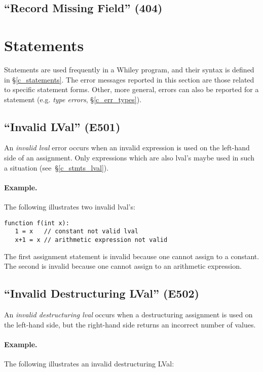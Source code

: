 \subsection{``Record Missing Field'' (404)}


\section{Statements}

Statements are used frequently in a Whiley program, and their syntax is defined in \S\ref{c_statements}.  The error messages reported in this section are those related to specific statement forms.  Other, more general, errors can also be reported for a statement (e.g. {\em type errors}, \S\ref{c_err_types}).

\subsection{``Invalid LVal'' (E501)}

An {\em invalid lval} error occurs when an invalid expression is used on the left-hand side of an assignment.  Only expressions which are also lval's maybe used in such a situation  (see~\S\ref{c_stmts_lval}).

\paragraph{Example.}  The following illustrates two invalid lval's:

\begin{lstlisting}
function f(int x):
   1 = x   // constant not valid lval
   x+1 = x // arithmetic expression not valid    
\end{lstlisting}

The first assignment statement is invalid because one cannot assign to a constant.  The second is invalid because one cannot assign to an arithmetic expression.

\subsection{``Invalid Destructuring LVal'' (E502)}

An {\em invalid destructuring lval} occurs when a destructuring assignment is used on the left-hand side, but the right-hand side returns an incorrect number of values.

\paragraph{Example.}  The following illustrates an invalid destructuring LVal:


